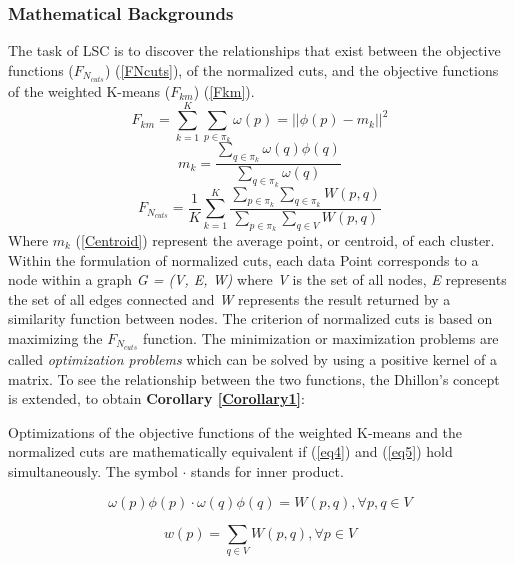 \subsubsection{Mathematical Backgrounds}
The task of LSC is to discover the relationships that exist between the objective 
functions ($ F_{N_{cuts}} $) (\ref{FNcuts}), of the normalized cuts, and the objective functions 
of the weighted K-means ($ F_{km}$) (\ref{Fkm}). 
\begin{equation} \label{Fkm}
    F_{km} = \sum_{k=1}^K\sum_{p\in\pi_k}\omega(p)= || \phi(p)-m_k ||^2 
\end{equation}
\begin{equation} \label{Centroid}
    m_k = \frac{\sum_{q\in\pi_k}\omega(q)\phi(q)}{\sum_{q\in\pi_k}\omega(q)}
\end{equation}
\begin{equation} \label{FNcuts}
    F_{N_{cuts}} = \frac{1}{K}\sum_{k=1}^K\frac{\sum_{p\in\pi_k}\sum_{q\in\pi_k}W(p,q)}{\sum_{p\in\pi_k}\sum_{q\in{V}}W(p,q)}
\end{equation}
Where $ m_k $ (\ref{Centroid}) represent the average point, or centroid, of each cluster. Within 
the formulation of normalized cuts, each data Point corresponds to a node 
within a graph \emph{G = (V, E, W)} where \emph{V} is the set of all nodes, \emph{E} represents 
the set of all edges connected and \emph{W} represents the result returned by a 
similarity function between nodes. The criterion of normalized cuts is based 
on maximizing the $ F_{N_{cuts}} $ function. The minimization or maximization problems 
are called \emph{optimization problems} which can be solved by using a positive kernel of 
a matrix. To see the relationship between the two functions, the Dhillon's concept \cite{0781426526} is extended, to obtain {\bfseries Corollary \ref{Corollary1}}:

\begin{corollary} \label{Corollary1}
    Optimizations of the objective functions of the weighted K-means
    and the normalized cuts are mathematically equivalent if (\ref{eq4}) and (\ref{eq5}) 
    hold simultaneously. The symbol $ \cdot $ stands for inner product.
\end{corollary}

\begin{equation} \label{eq4}
    \omega(p)\phi(p) \cdot \omega(q)\phi(q) = W(p,q), \forall p,q \in V
\end{equation}

\begin{equation} \label{eq5}
    w(p) = \sum_{q \in V} W(p,q), \forall p \in V
\end{equation}

